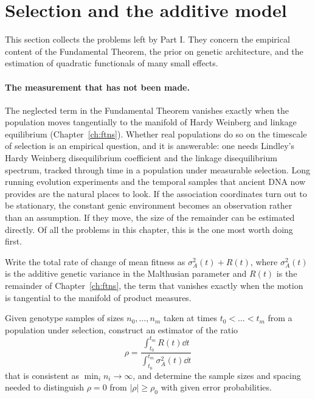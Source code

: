 \section{Selection and the additive model}

This section collects the problems left by Part I. They concern the empirical content of the
Fundamental Theorem, the prior on genetic architecture, and the estimation of quadratic functionals
of many small effects.

\paragraph{The measurement that has not been made.} The neglected term in the Fundamental Theorem
vanishes exactly when the population moves tangentially to the manifold of Hardy Weinberg and
linkage equilibrium (Chapter~\ref{ch:ftns}). Whether real populations do so on the timescale of
selection is an empirical question, and it is answerable: one needs Lindley's Hardy Weinberg
disequilibrium coefficient and the linkage disequilibrium spectrum, tracked through time in a
population under measurable selection. Long running evolution experiments and the temporal
samples that ancient DNA now provides are the natural places to look. If the association
coordinates turn out to be stationary, the constant genic environment becomes an observation
rather than an assumption. If they move, the size of the remainder can be estimated directly. Of
all the problems in this chapter, this is the one most worth doing first.

Write the total rate of change of mean fitness as $\sigma_A^2(t)+R(t)$, where $\sigma_A^2(t)$ is
the additive genetic variance in the Malthusian parameter and $R(t)$ is the remainder of Chapter~\ref{ch:ftns}, the term that vanishes exactly when the motion is tangential to the manifold of product measures.

\begin{question}\label{future:q:remainder}
Given genotype samples of sizes $n_0,\dots,n_m$ taken at times $t_0<\dots<t_m$ from a population
under selection, construct an estimator of the ratio
\begin{equation*}
\rho=\frac{\int_{t_0}^{t_m}R(t)\dd t}{\int_{t_0}^{t_m}\sigma_A^2(t)\dd t}
\end{equation*}
that is consistent as $\min_i n_i\to\infty$, and determine the sample sizes and spacing needed to
distinguish $\rho=0$ from $|\rho|\ge\rho_0$ with given error probabilities.
\end{question}

